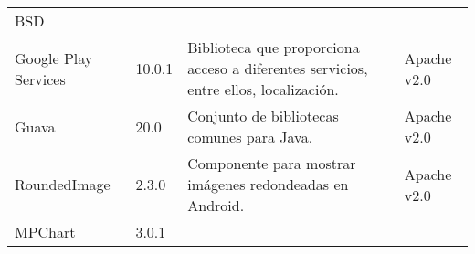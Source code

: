 \begin{longtable}[]{@{}llll@{}}
\begin{minipage}[t]{0.11\columnwidth}
BSD\strut
\end{minipage}\tabularnewline
\begin{minipage}[t]{0.18\columnwidth}\raggedright\strut
Google Play Services\strut
\end{minipage} & \begin{minipage}[t]{0.08\columnwidth}\raggedright\strut
10.0.1\strut
\end{minipage} & \begin{minipage}[t]{0.49\columnwidth}\raggedright\strut
Biblioteca que proporciona acceso a diferentes servicios, entre ellos,
localización.\strut
\end{minipage} & \begin{minipage}[t]{0.11\columnwidth}\raggedright\strut
Apache v2.0\strut
\end{minipage}\tabularnewline
\begin{minipage}[t]{0.18\columnwidth}\raggedright\strut
Guava\strut
\end{minipage} & \begin{minipage}[t]{0.08\columnwidth}\raggedright\strut
20.0\strut
\end{minipage} & \begin{minipage}[t]{0.49\columnwidth}\raggedright\strut
Conjunto de bibliotecas comunes para Java.\strut
\end{minipage} & \begin{minipage}[t]{0.11\columnwidth}\raggedright\strut
Apache v2.0\strut
\end{minipage}\tabularnewline
\begin{minipage}[t]{0.18\columnwidth}\raggedright\strut
RoundedImage\strut
\end{minipage} & \begin{minipage}[t]{0.08\columnwidth}\raggedright\strut
2.3.0\strut
\end{minipage} & \begin{minipage}[t]{0.49\columnwidth}\raggedright\strut
Componente para mostrar imágenes redondeadas en Android.\strut
\end{minipage} & \begin{minipage}[t]{0.11\columnwidth}\raggedright\strut
Apache v2.0\strut
\end{minipage}\tabularnewline
\begin{minipage}[t]{0.18\columnwidth}\raggedright\strut
MPChart\strut
\end{minipage} & \begin{minipage}[t]{0.08\columnwidth}\raggedright\strut
3.0.1\strut
\end{minipage} & \begin{minipage}[t]{0.49\columnwidth}\raggedright\strut

\end{minipage}
\end{longtable}
